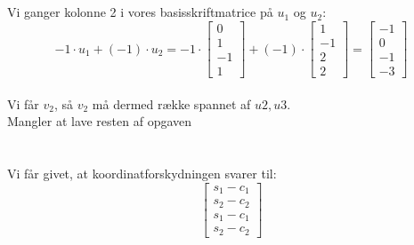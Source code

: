 \documentclass[a4paper,12pt]{article}
\begin{document}
\subsection{}

Vi ganger kolonne 2 i vores basisskriftmatrice på $u_1$ og $u_2$:
\[
-1 \cdot u_1 + (-1)\cdot u_2 =
-1 \cdot
\left[\begin{array}{ccc}
    0\\
    1\\
    -1\\
    1
\end{array}\right]
+
(-1) \cdot
\left[\begin{array}{ccc}
    1\\
    -1\\
    2\\
    2
\end{array}\right]
=
\left[\begin{array}{ccc}
    -1\\
    0\\
    -1\\
    -3
\end{array}\right]
\]\\

Vi får $v_2$, så $v_2$ må dermed række spannet af $u2, u3$.\\

Mangler at lave resten af opgaven

\subsection{}


\subsection{}


\section{}
\subsection{}

Vi får givet, at koordinatforskydningen svarer til:\\

\[
\left[\begin{array}{ccc}
    s_1-c_1\\
    s_2-c_2\\
    s_1-c_1\\
    s_2-c_2
\end{array}\right]
\]
\end{document}
